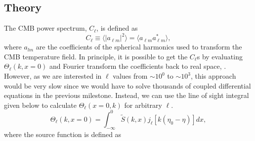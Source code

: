 \documentclass{aa}
\begin{document}
\subsection{Theory}
The CMB power spectrum, $C_\ell$, is defined as 
\begin{equation}
   C_\ell \equiv \langle |a_{\ell m}|^2 \rangle = \langle a_{\ell m}a_{\ell m}^* \rangle,
\end{equation}
where $a_{lm}$ are the coefficients of the spherical harmonics used to transform the CMB temperature field. In principle, it is possible to get the $C_\ell$s by evaluating $\Theta_\ell(k,x=0)$
and Fourier transform the coefficients back to real space, \cite{winther:2023}. However, as we are interested in $\ell$ values from $\sim 10^0$ to $\sim 10^3$, this approach would 
be very slow since we would have to solve thousands of coupled differential equations in the previous milestone. Instead, we can use the line of sight integral given below to calculate $\Theta_\ell(x=0,k)$ for arbitrary $\ell$.
\begin{equation}
   \Theta_\ell(k, x=0) = \int_{-\infty}^{0} \tilde{S}(k,x) j_\ell[k(\eta_0-\eta)] dx,
\end{equation}
where the source function is defined as 
\end{document}
